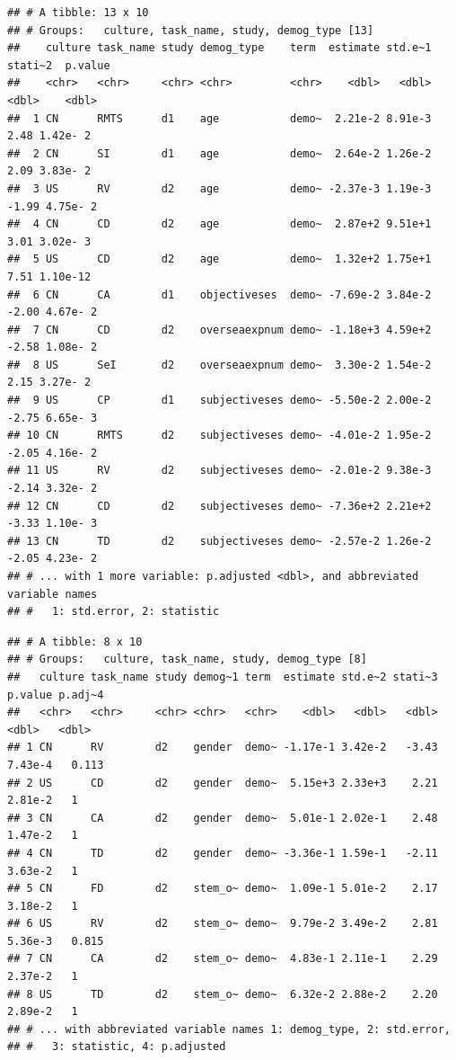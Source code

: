 \documentclass[
  man]{apa6}
\begin{document}
\begin{verbatim}
## # A tibble: 13 x 10
## # Groups:   culture, task_name, study, demog_type [13]
##    culture task_name study demog_type    term  estimate std.e~1 stati~2  p.value
##    <chr>   <chr>     <chr> <chr>         <chr>    <dbl>   <dbl>   <dbl>    <dbl>
##  1 CN      RMTS      d1    age           demo~  2.21e-2 8.91e-3    2.48 1.42e- 2
##  2 CN      SI        d1    age           demo~  2.64e-2 1.26e-2    2.09 3.83e- 2
##  3 US      RV        d2    age           demo~ -2.37e-3 1.19e-3   -1.99 4.75e- 2
##  4 CN      CD        d2    age           demo~  2.87e+2 9.51e+1    3.01 3.02e- 3
##  5 US      CD        d2    age           demo~  1.32e+2 1.75e+1    7.51 1.10e-12
##  6 CN      CA        d1    objectiveses  demo~ -7.69e-2 3.84e-2   -2.00 4.67e- 2
##  7 CN      CD        d2    overseaexpnum demo~ -1.18e+3 4.59e+2   -2.58 1.08e- 2
##  8 US      SeI       d2    overseaexpnum demo~  3.30e-2 1.54e-2    2.15 3.27e- 2
##  9 US      CP        d1    subjectiveses demo~ -5.50e-2 2.00e-2   -2.75 6.65e- 3
## 10 CN      RMTS      d2    subjectiveses demo~ -4.01e-2 1.95e-2   -2.05 4.16e- 2
## 11 US      RV        d2    subjectiveses demo~ -2.01e-2 9.38e-3   -2.14 3.32e- 2
## 12 CN      CD        d2    subjectiveses demo~ -7.36e+2 2.21e+2   -3.33 1.10e- 3
## 13 CN      TD        d2    subjectiveses demo~ -2.57e-2 1.26e-2   -2.05 4.23e- 2
## # ... with 1 more variable: p.adjusted <dbl>, and abbreviated variable names
## #   1: std.error, 2: statistic
\end{verbatim}

\begin{verbatim}
## # A tibble: 8 x 10
## # Groups:   culture, task_name, study, demog_type [8]
##   culture task_name study demog~1 term  estimate std.e~2 stati~3 p.value p.adj~4
##   <chr>   <chr>     <chr> <chr>   <chr>    <dbl>   <dbl>   <dbl>   <dbl>   <dbl>
## 1 CN      RV        d2    gender  demo~ -1.17e-1 3.42e-2   -3.43 7.43e-4   0.113
## 2 US      CD        d2    gender  demo~  5.15e+3 2.33e+3    2.21 2.81e-2   1    
## 3 CN      CA        d2    gender  demo~  5.01e-1 2.02e-1    2.48 1.47e-2   1    
## 4 CN      TD        d2    gender  demo~ -3.36e-1 1.59e-1   -2.11 3.63e-2   1    
## 5 CN      FD        d2    stem_o~ demo~  1.09e-1 5.01e-2    2.17 3.18e-2   1    
## 6 US      RV        d2    stem_o~ demo~  9.79e-2 3.49e-2    2.81 5.36e-3   0.815
## 7 CN      CA        d2    stem_o~ demo~  4.83e-1 2.11e-1    2.29 2.37e-2   1    
## 8 US      TD        d2    stem_o~ demo~  6.32e-2 2.88e-2    2.20 2.89e-2   1    
## # ... with abbreviated variable names 1: demog_type, 2: std.error,
## #   3: statistic, 4: p.adjusted
\end{verbatim}
\end{document}
